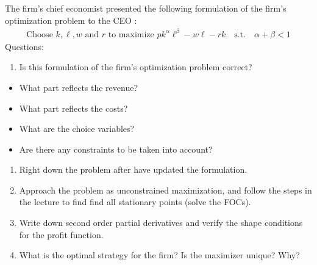 \documentclass[letterpaper,10pt,english]{jupyterBook}
\begin{document}
\sphinxAtStartPar
The firm’s chief economist  presented the following formulation of the firm’s optimization problem to the CEO :
\begin{equation*}
\begin{split}
\text{Choose } k, \ell, w \text{ and } r \text{ to maximize } 
p k^{\alpha} \ell^{\beta} - w \ell - r k 
\quad \mathrm{s.t.} \quad
\alpha + \beta < 1
\end{split}
\end{equation*}
\sphinxAtStartPar
Questions:
\begin{enumerate}
%
\item {} 
\sphinxAtStartPar
Is this formulation of the firm’s optimization problem correct?

\end{enumerate}
\begin{itemize}
\item {} 
\sphinxAtStartPar
What part reflects the revenue?

\item {} 
\sphinxAtStartPar
What part reflects the costs?

\item {} 
\sphinxAtStartPar
What are the choice variables?

\item {} 
\sphinxAtStartPar
Are there any constraints to be taken into account?

\end{itemize}
\begin{enumerate}
%
\setcounter{enumi}{1}
\item {} 
\sphinxAtStartPar
Right down the problem after  have updated the formulation.

\item {} 
\sphinxAtStartPar
Approach the problem as unconstrained maximization, and follow the steps in the lecture to find find all stationary points (solve the FOCs).

\item {} 
\sphinxAtStartPar
Write down second order partial derivatives and verify the shape conditions for the profit function.

\item {} 
\sphinxAtStartPar
What is the optimal strategy for the firm? Is the maximizer unique? Why?

\end{enumerate}
\end{document}
